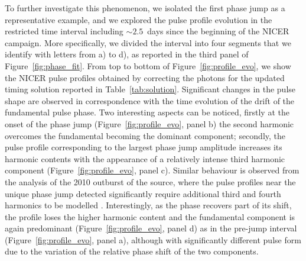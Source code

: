 \documentclass[fleqn,usenatbib]{mnras}
\newcommand{\nicer}{NICER}
\begin{document}
To further investigate this phenomenon, we isolated the first phase jump as a representative example, and we explored the pulse profile evolution in the restricted time interval including $\sim2.5$~days since the beginning of the \nicer{} campaign. More specifically, we divided the interval into four segments that we identify with letters from a) to d), as reported in the third panel of Figure~\ref{fig:phase_fit}. From top to bottom of Figure~\ref{fig:profile_evo}, we show the \nicer{} pulse profiles obtained by correcting the photons for the updated timing solution reported in Table~\ref{tab:solution}. Significant changes in the pulse shape are observed in correspondence with the time evolution of the drift of the fundamental pulse phase. Two interesting aspects can be noticed, firstly at the onset of the phase jump (Figure~\ref{fig:profile_evo}, panel b) the second harmonic overcomes the fundamental becoming the dominant component; secondly, the pulse profile corresponding to the largest phase jump amplitude increases its harmonic contents with the appearance of a relatively intense third harmonic component (Figure~\ref{fig:profile_evo}, panel c). Similar behaviour is observed from the analysis of the 2010 outburst of the source, where the pulse profiles near the unique phase jump detected significantly require additional third and fourth harmonics to be modelled \citep{Altamirano:2011uq}. Interestingly, as the phase recovers part of its shift, the profile loses the higher harmonic content and the fundamental component is again predominant (Figure~\ref{fig:profile_evo}, panel d) as in the pre-jump interval (Figure~\ref{fig:profile_evo}, panel a), although with significantly different pulse form due to the variation of the relative phase shift of the two components.   
\end{document}
